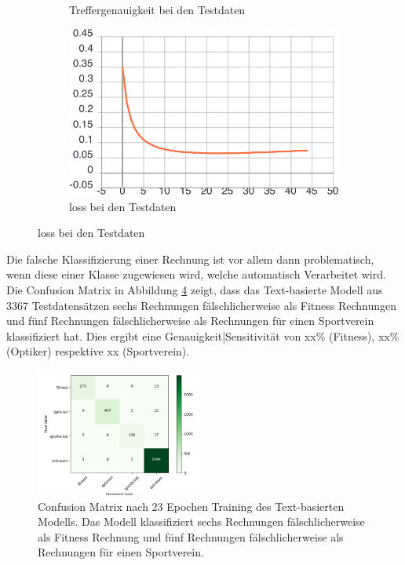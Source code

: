 \begin{figure}[ht]
\begin{subfigure}[b]{0.5\linewidth}
    \caption{Treffergenauigkeit bei den Testdaten} 
    \label{text-class-results:val_acc} 
  \end{subfigure}%
  \begin{subfigure}[b]{0.5\linewidth}
    \centering
    \includegraphics[width=0.75\linewidth]{graphics/text-classification/val_loss.pdf} 
    \caption{loss bei den Testdaten} 
    \label{text-class-results:val_loss} 
  \end{subfigure}
  \centering
\end{figure}

Die falsche Klassifizierung einer Rechnung ist vor allem dann problematisch, wenn diese einer Klasse zugewiesen wird, welche automatisch Verarbeitet wird. Die Confusion Matrix in Abbildung \ref{text-classification-cm} zeigt, dass das Text-basierte Modell aus 3367 Testdatensätzen sechs Rechnungen fälschlicherweise als Fitness Rechnungen und fünf Rechnungen fälschlicherweise als Rechnungen für einen Sportverein klassifiziert hat. Dies ergibt eine Genauigkeit|Sensitivität von xx\% (Fitness), xx\% (Optiker) respektive xx\5 (Sportverein). 


\begin{figure} 
    \caption{Confusion Matrix nach 23 Epochen Training des Text-basierten Modells. Das Modell klassifiziert sechs Rechnungen fälschlicherweise als Fitness Rechnung und fünf Rechnungen fälschlicherweise als Rechnungen für einen Sportverein.}
    \label{text-classification-cm}
    \centering
    \includegraphics[width=0.5\textwidth]{graphics/text-classification/cm_22.png}
\end{figure}

